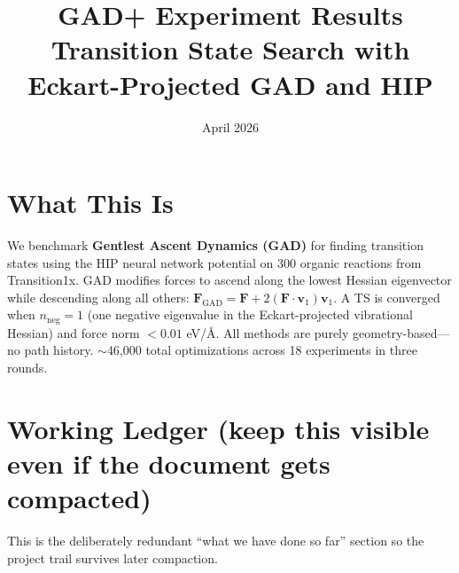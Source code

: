 \documentclass[11pt]{article}
\title{\Large\textbf{GAD+ Experiment Results}\\[4pt]
\normalsize Transition State Search with Eckart-Projected GAD and HIP}
\author{}
\date{April 2026}
\begin{document}
\maketitle
\thispagestyle{empty}

\section*{What This Is}

We benchmark \textbf{Gentlest Ascent Dynamics (GAD)} for finding transition states
using the HIP neural network potential on 300 organic reactions from Transition1x.
GAD modifies forces to ascend along the lowest Hessian eigenvector while descending
along all others:
$\mathbf{F}_{\text{GAD}} = \mathbf{F} + 2(\mathbf{F}\cdot\mathbf{v}_1)\mathbf{v}_1$.
A TS is converged when $n_{\text{neg}}=1$ (one negative eigenvalue in the
Eckart-projected vibrational Hessian) and force norm $< 0.01$ eV/\AA.
All methods are purely geometry-based---no path history. $\sim$46,000 total
optimizations across 18 experiments in three rounds.

\section*{Working Ledger \small(keep this visible even if the document gets compacted)}

This is the deliberately redundant ``what we have done so far'' section so the
project trail survives later compaction.
\end{document}
